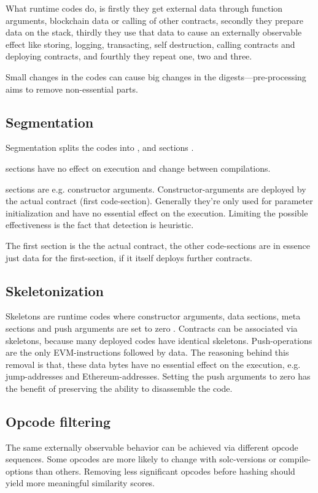 \documentclass[../main.tex]{subfiles}
\begin{document}
What runtime codes do, is firstly they get external data through function arguments, blockchain data or calling of other contracts, secondly they prepare data on the stack, thirdly they use that data to cause an externally observable effect like storing, logging, transacting, self destruction, calling contracts and deploying contracts, and fourthly they repeat one, two and three.

Small changes in the codes can cause big changes in the digests---pre-processing aims to remove non-essential parts.

\subsection{Segmentation \label{sec:seg}}
Segmentation splits the codes into ,  and  sections \cite{ethutils}.

 sections have no effect on execution and change between compilations.

 sections are e.g. constructor arguments.
Constructor-arguments are deployed by the actual contract (first code-section).
Generally they're only used for parameter initialization and have no essential effect on the execution.
Limiting the possible effectiveness is the fact that detection is heuristic.

The first  section is the the actual contract, the other code-sections are in essence just data for the first-section, if it itself deploys further contracts.

\subsection{Skeletonization \label{sec:skel}}
Skeletons are runtime codes where constructor arguments, data sections, meta sections and push arguments are set to zero \cite{ethutils}.
Contracts can be associated via skeletons, because many deployed codes have identical skeletons.
Push-operations are the only EVM-instructions followed by data.
The reasoning behind this removal is that, these data bytes have no essential effect on the execution, e.g. jump-addresses and Ethereum-addresses.
Setting the push arguments to zero has the benefit of preserving the ability to disassemble the code.

\subsection{Opcode filtering}
The same externally observable behavior can be achieved via different opcode sequences.
Some opcodes are more likely to change with solc-versions or compile-options than others.
Removing less significant opcodes before hashing should yield more meaningful similarity scores.
\end{document}
